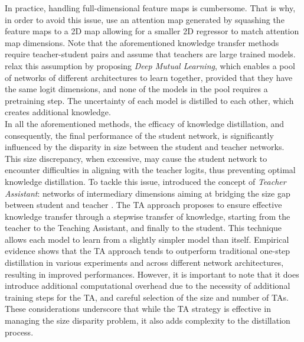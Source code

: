 In practice, handling full-dimensional feature maps is cumbersome. That is why,
in order to avoid this issue, \cite{DBLP:conf/iclr/ZagoruykoK17} use an
attention map generated by squashing the feature maps to a 2D map allowing for a
smaller 2D regressor to match attention map dimensions. Note that the
aforementioned knowledge transfer methods require teacher-student pairs and
assume that teachers are large trained models. \cite{DBLP:conf/cvpr/ZhangXHL18}
relax this assumption by proposing \emph{Deep Mutual Learning}, which enables a pool
of networks of different architectures to learn together, provided that they
have the same logit dimensions, and none of the models in the pool requires a
pretraining step. The uncertainty of each model is distilled to each other,
which creates additional knowledge.\\

In all the aforementioned methods, the efficacy of knowledge distillation, and
consequently, the final performance of the student network, is significantly
influenced by the disparity in size between the student and teacher networks.
This size discrepancy, when excessive, may cause the student network to
encounter difficulties in aligning with the teacher logits, thus preventing
optimal knowledge distillation. To tackle this issue,
\citeauthor{DBLP:conf/aaai/MirzadehFLLMG20} introduced the concept of
\emph{Teacher Assistant}: networks of intermediary dimensions aiming at bridging
the size gap between student and teacher \cite{DBLP:conf/aaai/MirzadehFLLMG20}.
The \ac{TA} approach proposes to ensure effective knowledge transfer
through a stepwise transfer of knowledge, starting from the teacher to the
Teaching Assistant, and finally to the student. This technique allows each model
to learn from a slightly simpler model than itself. Empirical evidence shows
that the \ac{TA} approach tends to outperform traditional one-step
distillation in various experiments and across different network architectures,
resulting in improved performances. However, it is important to note that it
does introduce additional computational overhead due to the necessity of
additional training steps for the \ac{TA}, and careful selection of
the size and number of \acp{TA}. These considerations underscore that
while the \ac{TA} strategy is effective in managing the size disparity
problem, it also adds complexity to the distillation process.\\


